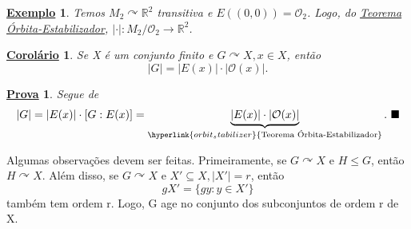 \documentclass{article}
\newtheorem*{crl*}{\underline{Corol\'ario}}
\newtheorem{example*}{\underline{Exemplo}}
\newtheorem*{proof*}{\underline{Prova}}
\renewcommand\qedsymbol{$\blacksquare$}
\begin{document}
   \begin{example*}
      Temos \(M_{2} \curvearrowright \mathbb{R}^{2}\) transitiva e \(E((0, 0)) = \mathcal{O}_{2}\). Logo, do \hyperlink{orbit_stabilizer}{Teorema Órbita-Estabilizador},
      \(|\cdot |:M_{2}/\mathcal{O}_{2}\rightarrow \mathbb{R}^{2}\).
   \end{example*}
  \begin{crl*}
    Se X é um conjunto finito e \(G \curvearrowright X, x\in X\), então 
      \[
        |G| = |E(x)|\cdot |\mathcal{O}(x)|.
      \]
  \end{crl*}
 \begin{proof*}
   Segue de 
     \[
       |G| = |E(x)|\cdot [G:E(x)] = \underbrace{|E(x)|\cdot |\mathcal{O}(x)|}_{\hyperlink{orbit_stabilizer}{\text{Teorema Órbita-Estabilizador}}}.\text{ \qedsymbol}
     \]
 \end{proof*}
  Algumas observa\c cões devem ser feitas. Primeiramente, se \(G \curvearrowright X\) e \(H\leq G\), então \(H \curvearrowright X\).
  Além disso, se \(G \curvearrowright X\) e \(X'\subseteq{X}, |X'| = r\), então 
    \[
      gX' = \{gy: y\in X'\}
    \]
  também tem ordem r. Logo, G age no conjunto dos subconjuntos de ordem r de X.
\end{document}
